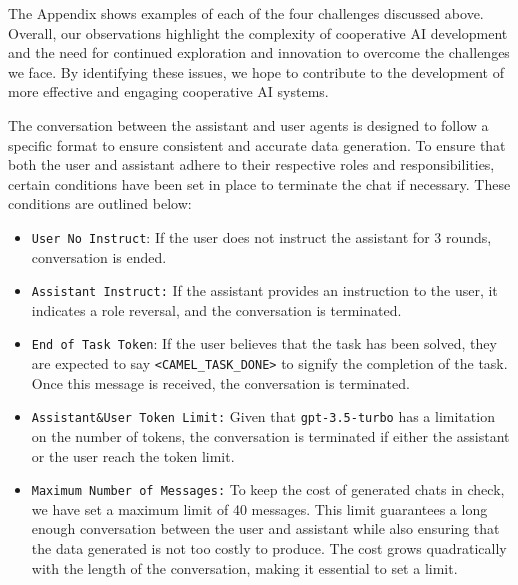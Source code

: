 The Appendix shows examples of each of the four challenges discussed above. Overall, our observations highlight the complexity of cooperative AI development and the need for continued exploration and innovation to overcome the challenges we face. By identifying these issues, we hope to contribute to the development of more effective and engaging cooperative AI systems.



 The conversation between the assistant and user agents is designed to follow a specific format to ensure consistent and accurate data generation. To ensure that both the user and assistant adhere to their respective roles and responsibilities, certain conditions have been set in place to terminate the chat if necessary. These conditions are outlined below:

\begin{itemize}[leftmargin=0.5cm]
    \item 
\texttt{User No Instruct}: If the user does not instruct the assistant for 3 rounds, conversation is ended.
    \item \texttt{Assistant Instruct:} If the assistant provides an instruction to the user, it indicates a role reversal, and the conversation is terminated.
    \item \texttt{End of Task Token}: If the user believes that the task has been solved, they are expected to say \texttt{<CAMEL\_TASK\_DONE>} to signify the completion of the task. Once this message is received, the conversation is terminated.
    \item \texttt{Assistant\&User Token Limit:} Given that \texttt{gpt-3.5-turbo} has a limitation on the number of tokens, the conversation is terminated if either the assistant or the user reach the token limit.
    \item \texttt{Maximum Number of Messages:} To keep the cost of generated chats in check, we have set a maximum limit of 40 messages. This limit guarantees a long enough conversation between the user and assistant while also ensuring that the data generated is not too costly to produce. The cost grows quadratically with the length of the conversation, making it essential to set a limit.
\end{itemize}

